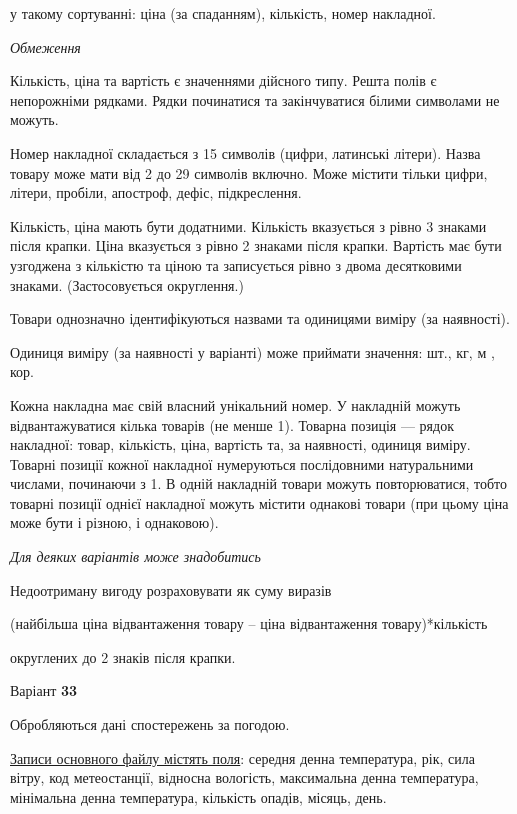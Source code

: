 \documentclass[11pt, ukrainian]{article}
\begin{document}
{\noindent}у такому сортуванні: ціна (за спаданням), кількість, номер накладної.


\bigskip\textit{Обмеження}

Кількість, ціна та вартість є значеннями дійсного типу.
Решта полів є непорожніми рядками.
Рядки починатися та закінчуватися білими символами не можуть.

Номер накладної складається з 15 символів (цифри, латинські літери).
Назва товару може мати від 2 до 29 символів включно.
Може містити тільки цифри, літери, пробіли, апостроф, дефіс, підкреслення.

Кількість, ціна мають бути додатними.
Кількість вказується з рівно 3 знаками після крапки.
Ціна вказується з рівно 2 знаками після крапки.
Вартість має бути узгоджена з кількістю та ціною та записується рівно з двома десятковими знаками.
(Застосовується округлення.)

Товари однозначно ідентифікуються назвами та одиницями виміру (за наявності).

Одиниця виміру (за наявності у варіанті) може приймати значення: шт., кг, м , кор.

Кожна накладна має свій власний унікальний номер.
У накладній можуть відвантажуватися кілька товарів (не менше 1).
Товарна позиція --- рядок накладної: товар, кількість, ціна, вартість та, за наявності, одиниця виміру.
Товарні позиції кожної накладної нумеруються послідовними натуральними числами, починаючи з 1.
В одній накладній товари можуть повторюватися, 
тобто товарні позиції однієї накладної можуть містити однакові товари 
(при цьому ціна може бути і різною, і однаковою).

\bigskip\textit{Для деяких варіантів може знадобитись}

Недоотриману вигоду розраховувати як суму виразів
{\center (найбільша ціна відвантаження товару – ціна відвантаження товару)*кількість\par}

\bigskip
{\noindent} округлених до 2 знаків після крапки.




\par
\newpage
{\center Варіант  \No \textbf { 33 }\par}
\bigskip
Обробляються дані спостережень за погодою. 

\underline{Записи основного файлу містять поля}: середня денна температура, рік, сила вітру, код метеостанції, відносна вологість, максимальна денна температура, мінімальна денна температура, кількість опадів, місяць, день.
\end{document}

